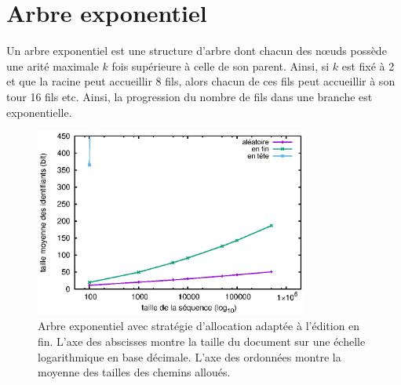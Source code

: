 

\section{Arbre exponentiel}
\label{repl:sec:exponentialtree}

Un arbre exponentiel est une structure d'arbre dont chacun des nœuds possède une
arité maximale $k$ fois supérieure à celle de son parent. Ainsi, si $k$ est fixé
à 2 et que la racine peut accueillir 8 fils, alors chacun de ces fils peut
accueillir à son tour 16 fils etc. Ainsi, la progression du nombre de fils dans
une branche est exponentielle.


\begin{figure}
  \centering
  \includegraphics[width=0.8\textwidth]{img/lseq/double.eps}
  \caption{\label{repl:img:exponentialtree} Arbre exponentiel avec stratégie
    d'allocation adaptée à l'édition en fin. L'axe des abscisses montre la
    taille du document sur une échelle logarithmique en base décimale. L'axe des
    ordonnées montre la moyenne des tailles des chemins alloués.}
\end{figure}

